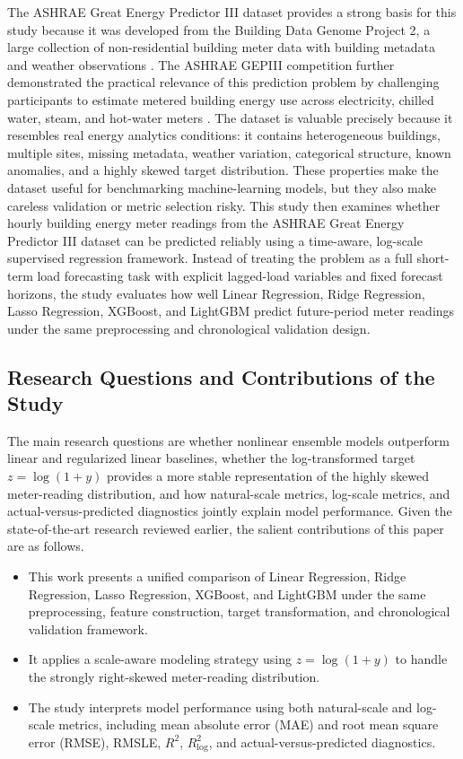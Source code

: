 \documentclass[conference]{IEEEtran}
\begin{document}
The ASHRAE Great Energy Predictor III dataset provides a strong basis for this study because it was developed from the Building Data Genome Project 2, a large collection of non-residential building meter data with building metadata and weather observations \cite{miller2020bdg2}. The ASHRAE GEPIII competition further demonstrated the practical relevance of this prediction problem by challenging participants to estimate metered building energy use across electricity, chilled water, steam, and hot-water meters \cite{miller2020ashrae}. The dataset is valuable precisely because it resembles real energy analytics conditions: it contains heterogeneous buildings, multiple sites, missing metadata, weather variation, categorical structure, known anomalies, and a highly skewed target distribution. These properties make the dataset useful for benchmarking machine-learning models, but they also make careless validation or metric selection risky. This study then examines whether hourly building energy meter readings from the ASHRAE Great Energy Predictor III dataset can be predicted reliably using a time-aware, log-scale supervised regression framework. Instead of treating the problem as a full short-term load forecasting task with explicit lagged-load variables and fixed forecast horizons, the study evaluates how well Linear Regression, Ridge Regression, Lasso Regression, XGBoost, and LightGBM predict future-period meter readings under the same preprocessing and chronological validation design. 

\subsection{Research Questions and Contributions of the Study}
The main research questions are whether nonlinear ensemble models outperform linear and regularized linear baselines, whether the log-transformed target $z=\log(1+y)$ provides a more stable representation of the highly skewed meter-reading distribution, and how natural-scale metrics, log-scale metrics, and actual-versus-predicted diagnostics jointly explain model performance. Given the state-of-the-art research reviewed earlier, the salient contributions of this paper are as follows.
\begin{itemize}
\item This work presents a unified comparison of Linear Regression, Ridge Regression, Lasso Regression, XGBoost, and LightGBM under the same preprocessing, feature construction, target transformation, and chronological validation framework. 
\item It applies a scale-aware modeling strategy using $z=\log(1+y)$ to handle the strongly right-skewed meter-reading distribution.
\item The study interprets model performance using both natural-scale and log-scale metrics, including mean absolute error (MAE) and root mean square error (RMSE), RMSLE, $R^{2}$, $R^{2}_{\log}$, and actual-versus-predicted diagnostics. 
\end{itemize}
\end{document}
